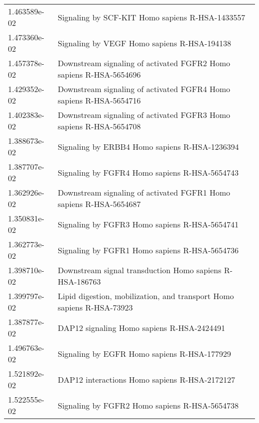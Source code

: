 \begin{longtable}{p{2.4cm}p{14.5cm}}
             1.463589e-02 &                                               Signaling by SCF-KIT Homo sapiens R-HSA-1433557 \\
             1.473360e-02 &                                                   Signaling by VEGF Homo sapiens R-HSA-194138 \\
             1.457378e-02 &                            Downstream signaling of activated FGFR2 Homo sapiens R-HSA-5654696 \\
             1.429352e-02 &                            Downstream signaling of activated FGFR4 Homo sapiens R-HSA-5654716 \\
             1.402383e-02 &                            Downstream signaling of activated FGFR3 Homo sapiens R-HSA-5654708 \\
             1.388673e-02 &                                                 Signaling by ERBB4 Homo sapiens R-HSA-1236394 \\
             1.387707e-02 &                                                 Signaling by FGFR4 Homo sapiens R-HSA-5654743 \\
             1.362926e-02 &                            Downstream signaling of activated FGFR1 Homo sapiens R-HSA-5654687 \\
             1.350831e-02 &                                                 Signaling by FGFR3 Homo sapiens R-HSA-5654741 \\
             1.362773e-02 &                                                 Signaling by FGFR1 Homo sapiens R-HSA-5654736 \\
             1.398710e-02 &                                      Downstream signal transduction Homo sapiens R-HSA-186763 \\
             1.399797e-02 &                         Lipid digestion, mobilization, and transport Homo sapiens R-HSA-73923 \\
             1.387877e-02 &                                                    DAP12 signaling Homo sapiens R-HSA-2424491 \\
             1.496763e-02 &                                                   Signaling by EGFR Homo sapiens R-HSA-177929 \\
             1.521892e-02 &                                                 DAP12 interactions Homo sapiens R-HSA-2172127 \\
             1.522555e-02 &                                                 Signaling by FGFR2 Homo sapiens R-HSA-5654738 \\

\end{longtable}

